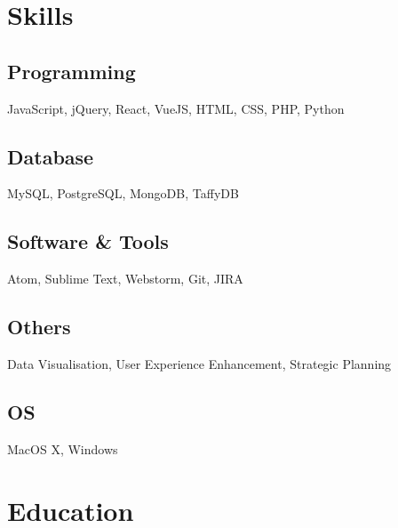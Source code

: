 \documentclass[]{gagan-resume}
\begin{document}
\lastupdated






\begin{minipage}[t]{0.33\textwidth} 




\section{Skills}
\subsection{Programming}
JavaScript, jQuery, React, VueJS, HTML, CSS, PHP, Python
\subsection{Database}
MySQL, PostgreSQL, MongoDB, TaffyDB
\subsection{Software \& Tools}
Atom, Sublime Text, Webstorm, Git, JIRA
\subsection{Others}
Data Visualisation, User Experience Enhancement, Strategic Planning
\subsection{OS}
MacOS X, Windows
\sectionsep




\section{Education} 


\end{minipage}
\end{document}
